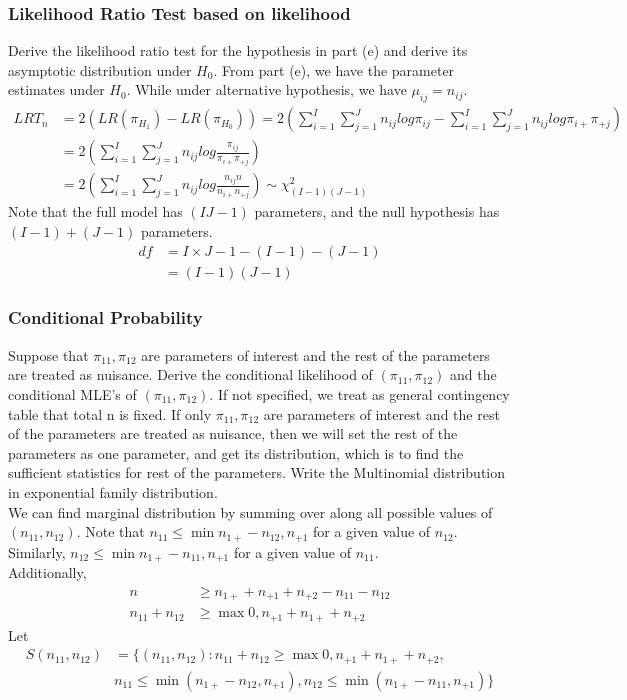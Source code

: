 
\subsubsection{Likelihood Ratio Test based on likelihood}

Derive the likelihood ratio test for the hypothesis in part (e) and derive its asymptotic distribution under $H_0$.
From part (e), we have the parameter estimates under $H_0$. While under alternative hypothesis, we have $\mu_{ij} = n_{ij}$. 
\begin{align*}
	LRT_n &= 2(LR(\pi_{H_1}) - LR(\pi_{H_0})) =2\left( \sum_{i=1}^I \sum_{j=1}^J n_{ij} log \pi_{ij} - \sum_{i=1}^I \sum_{j=1}^J n_{ij} log \pi_{i+} \pi_{+j} \right)\\
	&= 2\left( \sum_{i=1}^I \sum_{j=1}^J n_{ij} log \frac{\pi_{ij}}{\pi_{i+} \pi_{+j} }   \right)\\
	&= 2\left( \sum_{i=1}^I \sum_{j=1}^J n_{ij} log \frac{n_{ij} n}{n_{i+} n_{+j} }   \right) \sim \chi^2_{(I-1)(J-1)} 
\end{align*}
Note that the full model has $(IJ-1)$ parameters, and the null hypothesis has $(I-1)+ (J-1)$ parameters.
\begin{align*}
	df &= I \times J-1 - (I-1) - (J-1)\\
	&= (I-1)(J-1)
\end{align*}

\subsubsection{Conditional Probability}

Suppose that $\pi_{11}, \pi_{12}$ are parameters of interest and the rest of the parameters are treated as nuisance. Derive the conditional likelihood of $(\pi_{11}, \pi_{12})$ and the conditional MLE's of  $(\pi_{11}, \pi_{12})$.
If not specified, we treat as general contingency table that total n is fixed. If only $\pi_{11}, \pi_{12}$ are parameters of interest and the rest of the parameters are treated as nuisance, then we will set the rest of the parameters as one parameter, and get its distribution, which is to find the sufficient statistics for rest of the parameters.
Write the Multinomial distribution in exponential family distribution.\\
We can find marginal distribution by summing over along all possible values of $(n_{11}, n_{12})$. Note that $n_{11} \leq \min{n_{1+} - n_{12}, n_{+1}}$ for a given value of $n_{12}$. Similarly, $n_{12} \leq \min{n_{1+}- n_{11}, n_{+1}}$ for a given value of $n_{11}$. \\
Additionally,
\begin{align*}
	n & \geq n_{1+} + n_{+1} + n_{+2} - n_{11} - n_{12} \\
	n_{11} + n_{12} & \geq \max{ 0, n_{+1} + n_{1+} + n_{+2}}
\end{align*}
Let
\begin{align*}
	S(n_{11}, n_{12}) &= \{(n_{11}, n_{12}): n_{11} + n_{12} \geq \max{ 0, n_{+1} + n_{1+} + n_{+2}},\\
	&  n_{11} \leq \min{(n_{1+} - n_{12}, n_{+1})}, n_{12} \leq \min{(n_{1+}- n_{11}, n_{+1})}   \} 
\end{align*}

